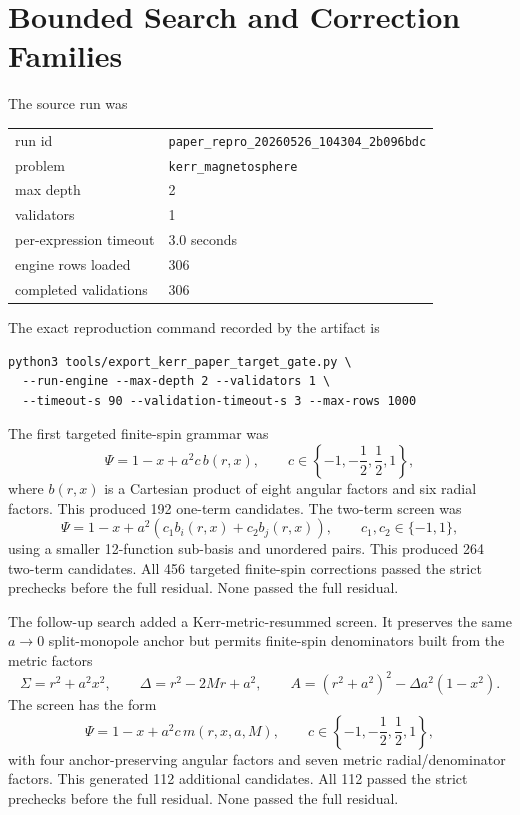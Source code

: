 \documentclass[11pt]{article}
\newcommand{\code}[1]{\texttt{#1}}
\begin{document}
\section{Bounded Search and Correction Families}

The source run was
\begin{center}
\begin{tabular}{ll}
\toprule
run id & \code{paper\_repro\_20260526\_104304\_2b096bdc}\\
problem & \code{kerr\_magnetosphere}\\
max depth & 2\\
validators & 1\\
per-expression timeout & 3.0 seconds\\
engine rows loaded & 306\\
completed validations & 306\\
\bottomrule
\end{tabular}
\end{center}

The exact reproduction command recorded by the artifact is
\begin{verbatim}
python3 tools/export_kerr_paper_target_gate.py \
  --run-engine --max-depth 2 --validators 1 \
  --timeout-s 90 --validation-timeout-s 3 --max-rows 1000
\end{verbatim}

The first targeted finite-spin grammar was
\begin{equation}
  \Psi = 1-x+a^2 c\,b(r,x),
  \qquad
  c\in\left\{-1,-\frac12,\frac12,1\right\},
\end{equation}
where $b(r,x)$ is a Cartesian product of eight angular factors and six radial
factors.  This produced 192 one-term candidates.  The two-term screen was
\begin{equation}
  \Psi = 1-x+a^2\left(c_1 b_i(r,x)+c_2 b_j(r,x)\right),
  \qquad c_1,c_2\in\{-1,1\},
\end{equation}
using a smaller 12-function sub-basis and unordered pairs.  This produced 264
two-term candidates.  All 456 targeted finite-spin corrections passed the
strict prechecks before the full residual.  None passed the full residual.

The follow-up search added a Kerr-metric-resummed screen.  It preserves the
same $a\to0$ split-monopole anchor but permits finite-spin denominators built
from the metric factors
\begin{equation}
  \Sigma = r^2+a^2x^2,\qquad
  \Delta = r^2-2Mr+a^2,\qquad
  A = (r^2+a^2)^2-\Delta a^2(1-x^2).
\end{equation}
The screen has the form
\begin{equation}
  \Psi = 1-x+a^2 c\,m(r,x,a,M),
  \qquad
  c\in\left\{-1,-\frac12,\frac12,1\right\},
\end{equation}
with four anchor-preserving angular factors and seven metric radial/denominator
factors.  This generated 112 additional candidates.  All 112 passed the strict
prechecks before the full residual.  None passed the full residual.
\end{document}
